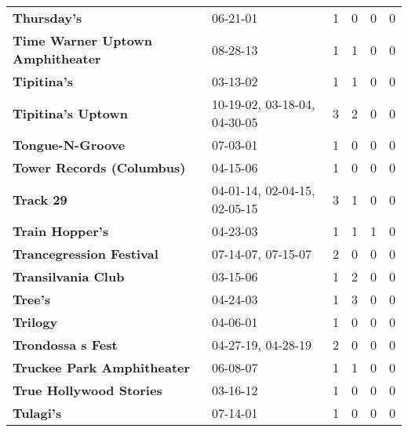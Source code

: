 \begin{supertabular}{llllll}
                                                  \textbf{Thursday's} &                      06-21-01 &  1 &   0 &  0 &  0 \\
                             \textbf{Time Warner Uptown Amphitheater} &                      08-28-13 &  1 &   1 &  0 &  0 \\
                                                  \textbf{Tipitina's} &                      03-13-02 &  1 &   1 &  0 &  0 \\
                                           \textbf{Tipitina's Uptown} &  10-19-02, 03-18-04, 04-30-05 &  3 &   2 &  0 &  0 \\
                                             \textbf{Tongue-N-Groove} &                      07-03-01 &  1 &   0 &  0 &  0 \\
                                    \textbf{Tower Records (Columbus)} &                      04-15-06 &  1 &   0 &  0 &  0 \\
                                                    \textbf{Track 29} &  04-01-14, 02-04-15, 02-05-15 &  3 &   1 &  0 &  0 \\
                                              \textbf{Train Hopper's} &                      04-23-03 &  1 &   1 &  1 &  0 \\
                                     \textbf{Trancegression Festival} &            07-14-07, 07-15-07 &  2 &   0 &  0 &  0 \\
                                           \textbf{Transilvania Club} &                      03-15-06 &  1 &   2 &  0 &  0 \\
                                                      \textbf{Tree's} &                      04-24-03 &  1 &   3 &  0 &  0 \\
                                                     \textbf{Trilogy} &                      04-06-01 &  1 &   0 &  0 &  0 \\
                                            \textbf{Trondossa s Fest} &            04-27-19, 04-28-19 &  2 &   0 &  0 &  0 \\
                                   \textbf{Truckee Park Amphitheater} &                      06-08-07 &  1 &   1 &  0 &  0 \\
                                      \textbf{True Hollywood Stories} &                      03-16-12 &  1 &   0 &  0 &  0 \\
                                                    \textbf{Tulagi's} &                      07-14-01 &  1 &   0 &  0 &  0 \\

\end{supertabular}
